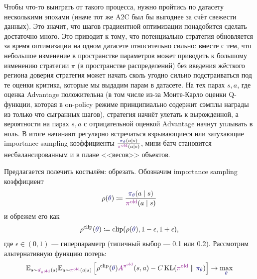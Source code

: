 Чтобы что-то выиграть от такого процесса, нужно пройтись по датасету несколькими эпохами (иначе тот же A2C был бы выгоднее за счёт свежести данных). Это значит, что шагов градиентной оптимизации понадобится сделать достаточно много. Это приводит к тому, что потенциально стратегия обновляется за время оптимизации на одном датасете относительно сильно: вместе с тем, что небольшое изменение в пространстве параметров может приводить к большому изменению стратегии $\pi$ (в пространстве распределений) без введения жёсткого региона доверия стратегия может начать сколь угодно сильно подстраиваться под те оценки критика, которые мы выдадим парам в датасете. На тех парах $s, a$, где оценка Advantage положительна (в том числе из-за Монте-Карло оценки Q-функции, которая в on-policy режиме принципиально содержит сэмплы награды из только что сыгранных шагов), стратегия начнёт улетать к вырожденной, а вероятности на парах $s, a$ с отрицательной оценкой Advantage начнут уплывать в ноль. В итоге начинают регулярно встречаться взрывающиеся или затухающие importance sampling коэффициенты $\frac{\textcolor{ChadBlue}{\pi_\theta}(a \mid s)}{\textcolor{ChadPurple}{\pi^{\old}}(a \mid s)}$, мини-батч становится несбалансированным и в плане <<весов>> объектов.

Предлагается полечить костылём: обрезать. Обозначим importance sampling коэффициент
$$\rho(\textcolor{ChadBlue}{\theta}) \coloneqq \frac{\textcolor{ChadBlue}{\pi_\theta}(a \mid s)}{\textcolor{ChadPurple}{\pi^{\old}}(a \mid s)}$$
и обрежем его как
$$\rho^{\clip}(\textcolor{ChadBlue}{\theta}) \coloneqq \clip(\rho(\textcolor{ChadBlue}{\theta}), 1 - \epsilon, 1 + \epsilon),$$
где $\epsilon \in (0, 1)$ --- гиперпараметр (типичный выбор --- 0.1 или 0.2). Рассмотрим альтернативную функцию потерь:
\begin{equation*}
\E_{s \sim \textcolor{ChadPurple}{d_{\pi^{\old}}}(s)} \E_{a \sim \textcolor{ChadPurple}{\pi^{\old}}(a \mid s)} \left[ \rho^{\clip}(\textcolor{ChadBlue}{\theta}) \textcolor{ChadPurple}{A^{\pi^{\old}}}(s, a) - C \KL(\textcolor{ChadPurple}{\pi^{\old}} \parallel \textcolor{ChadBlue}{\pi_\theta}) \right] \to \max_{\textcolor{ChadBlue}{\theta}}
\end{equation*}

